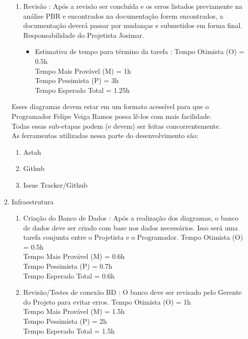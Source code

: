 \documentclass[12pt,a4paper,final]{report}
\begin{document}
\begin{enumerate}
\begin{enumerate}
\item Revisão : Após a revisão ser concluída e os erros listados previamente na análise PBR e encontrados na documentação forem encontrados, a documentação deverá passar por mudanças e submetidos em forma final. Responsabilidade do Projetista Josimar.
\begin{itemize}
\item Estimativa de tempo para término da tarefa :
Tempo Otimista (O) = 0.5h\\
Tempo Mais Provável (M) = 1h\\
Tempo Pessimista (P) = 3h\\
Tempo Esperado Total = 1.25h
\end{itemize} 
\end{enumerate}

Esses diagramas devem estar em um formato acessível para que o Programador Felipe Veiga Ramos possa lê-los com mais facilidade.\\
Todas essas sub-etapas podem (e devem) ser feitas concorrentemente.\\
As ferramentas utilizadas nessa parte do desenvolvimento são:
\begin{enumerate}
\item Astah
\item Github
\item Issue Tracker/Github
\end{enumerate}

\item Infraestrutura
\begin{enumerate}
\item Criação do Banco de Dados : Após a realização dos diagramas, o banco de dados deve ser criado com base nos dados necessários. Isso será uma tarefa conjunta entre o Projetista e o Programador.
Tempo Otimista (O) = 0.5h\\
Tempo Mais Provável (M) = 0.6h\\
Tempo Pessimista (P) = 0.7h\\
Tempo Esperado Total = 0.6h

\item Revisão/Testes de conexão BD : O banco deve ser revisado pelo Gerente do Projeto para evitar erros.
Tempo Otimista (O) = 1h\\
Tempo Mais Provável (M) = 1.5h\\
Tempo Pessimista (P) = 2h\\
Tempo Esperado Total = 1.5h
\end{enumerate}


\end{enumerate}
\end{document}
